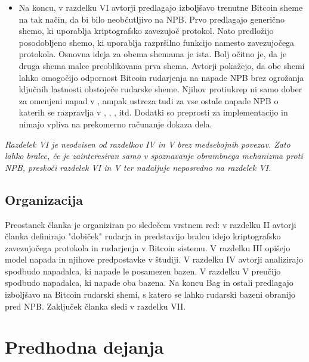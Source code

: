 \documentclass{acm_proc_article-sp}
\begin{document}
\begin{itemize}
	\item Na koncu, v razdelku VI avtorji predlagajo izboljšavo trenutne Bitcoin sheme na tak način, da bi bilo neobčutljivo na NPB. Prvo predlagajo generično shemo, ki uporablja kriptografsko zavezujoč protokol. Nato predložijo posodobljeno shemo, ki uporablja razpršilno funkcijo namesto zavezujočega protokola. Osnovna ideja za obema shemama je ista. Bolj očitno je, da je druga shema malce preoblikovana prva shema. Avtorji pokažejo, da obe shemi lahko omogočijo odpornost Bitcoin rudarjenja na napade NPB brez ogrožanja ključnih lastnosti obstoječe rudarske sheme. Njihov protiukrep ni samo dober za omenjeni napad v  \cite{originalarticle}, ampak ustreza tudi za vse ostale napade NPB o katerih se razpravlja v \cite{analysisofbitcoin}, \cite{minnersdilemma}, \cite{subversivestrategies}, itd. Dodatki so preprosti za implementacijo in nimajo vpliva na prekomerno računanje dokaza dela.
\end{itemize}

\textit{
	Razdelek VI je neodvisen od razdelkov IV in V brez medsebojnih povezav. Zato lahko bralec, če je zainteresiran samo v spoznavanje obrambnega mehanizma proti NPB, preskoči razdelek VI in V ter nadaljuje neposredno na razdelek VI. }

\subsection{Organizacija}

Preostanek članka  \cite{originalarticle} je organiziran po sledečem vrstnem red: v razdelku II avtorji članka definirajo "dobiček" rudarja in predstavijo bralcu idejo kriptografsko zavezujočega protokola in rudarjenja v Bitcoin sistemu. V razdelku III opišejo model napada in njihove predpostavke v študiji. V razdelku IV avtorji analizirajo spodbudo napadalca, ki napade le posamezen bazen. V razdelku V preučijo spodbudo napadalca, ki napade oba bazena. Na koncu Bag  \cite{originalarticle} in ostali predlagajo izboljšavo na Bitcoin rudarski shemi, s katero se lahko rudarski bazeni obranijo pred NPB. Zaključek članka sledi v razdelku VII.

\section{Predhodna dejanja}
\end{document}
